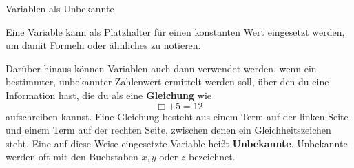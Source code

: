 \documentclass[../../main.tex]{subfiles}
\begin{document}
\begin{nutshell}{Variablen als Unbekannte}

    Eine Variable kann als Platzhalter für einen konstanten Wert eingesetzt werden, um damit Formeln oder ähnliches zu notieren.

    Darüber hinaus können Variablen auch dann verwendet werden, wenn ein bestimmter, unbekannter Zahlenwert ermittelt werden soll, über den du eine Information hast, die du als eine \textbf{Gleichung} wie
    \[\Box+5=12\]
    aufschreiben kannst. Eine Gleichung besteht aus einem Term auf der linken Seite und einem Term auf der rechten Seite, zwischen denen ein Gleichheitszeichen steht. Eine auf diese Weise eingesetzte Variable heißt \textbf{Unbekannte}. Unbekannte werden oft mit den Buchstaben $x,y$ oder $z$ bezeichnet.
\end{nutshell}
\end{document}
